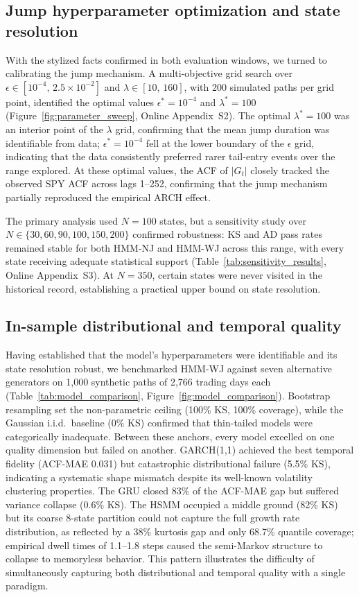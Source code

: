 \subsection{Jump hyperparameter optimization and state resolution}
With the stylized facts confirmed in both evaluation windows, we turned to calibrating the jump mechanism. A multi-objective grid search over $\epsilon\in[10^{-4},\,2.5\times10^{-2}]$ and $\lambda\in[10,\,160]$, with 200 simulated paths per grid point, identified the optimal values $\epsilon^{*}=10^{-4}$ and $\lambda^{*}=100$ (Figure~\ref{fig:parameter_sweep}, Online Appendix~S2). The optimal $\lambda^{*}=100$ was an interior point of the $\lambda$ grid, confirming that the mean jump duration was identifiable from data; $\epsilon^{*}=10^{-4}$ fell at the lower boundary of the $\epsilon$ grid, indicating that the data consistently preferred rarer tail-entry events over the range explored. At these optimal values, the ACF of $|G_t|$ closely tracked the observed SPY ACF across lags 1--252, confirming that the jump mechanism partially reproduced the empirical ARCH effect.

The primary analysis used $N=100$ states, but a sensitivity study over $N\in\{30,60,90,100,150,200\}$ confirmed robustness: KS and AD pass rates remained stable for both HMM-NJ and HMM-WJ across this range, with every state receiving adequate statistical support (Table~\ref{tab:sensitivity_results}, Online Appendix~S3). At $N=350$, certain states were never visited in the historical record, establishing a practical upper bound on state resolution.


\subsection{In-sample distributional and temporal quality}
Having established that the model's hyperparameters were identifiable and its state resolution robust, we benchmarked HMM-WJ against seven alternative generators on 1,000 synthetic paths of 2,766 trading days each (Table~\ref{tab:model_comparison}, Figure~\ref{fig:model_comparison}). Bootstrap resampling set the non-parametric ceiling (100\% KS, 100\% coverage), while the Gaussian i.i.d.\ baseline (0\% KS) confirmed that thin-tailed models were categorically inadequate. Between these anchors, every model excelled on one quality dimension but failed on another. GARCH(1,1) achieved the best temporal fidelity (ACF-MAE 0.031) but catastrophic distributional failure (5.5\% KS), indicating a systematic shape mismatch despite its well-known volatility clustering properties. The GRU closed 83\% of the ACF-MAE gap but suffered variance collapse (0.6\% KS). The HSMM occupied a middle ground (82\% KS) but its coarse 8-state partition could not capture the full growth rate distribution, as reflected by a 38\% kurtosis gap and only 68.7\% quantile coverage; empirical dwell times of 1.1--1.8 steps caused the semi-Markov structure to collapse to memoryless behavior. This pattern illustrates the difficulty of simultaneously capturing both distributional and temporal quality with a single paradigm.

